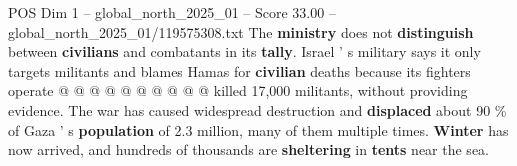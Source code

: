 \begin{textsample}{POS Dim 1 – global\_north\_2025\_01 – Score 33.00 – global\_north\_2025\_01/119575308.txt}
The \textbf{ministry} does not \textbf{distinguish} between \textbf{civilians} and combatants in its \textbf{tally}.
Israel ' s military says it only targets militants and blames Hamas for \textbf{civilian} deaths because its fighters operate @ @ @ @ @ @ @ @ @ @ killed 17,000 militants, without providing evidence.
The war has caused widespread destruction and \textbf{displaced} about 90 \% of Gaza ' s \textbf{population} of 2.3 million, many of them multiple times. \textbf{Winter} has now arrived, and hundreds of thousands are \textbf{sheltering} in \textbf{tents} near the sea.

\end{textsample}
